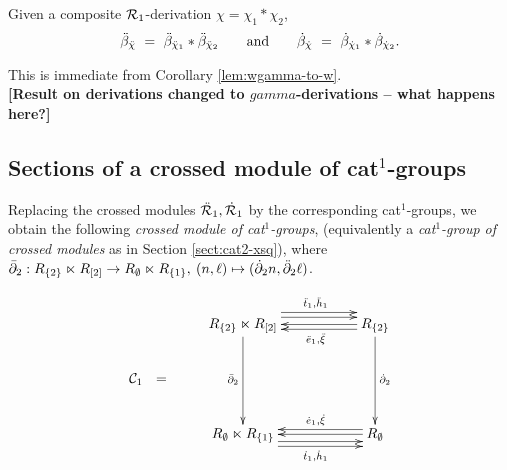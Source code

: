 \begin{lem}
Given a composite $\mathcal{R}_1$-derivation $\chi = \chi_1 * \chi_2$, 
$$
\ddot{\beta}_{\ddot{\chi}} ~=~ \ddot{\beta}_{\ddot{\chi}_1} * \ddot{\beta}_{\ddot{\chi}_2} 
\qquad \mbox{and} \qquad
 \dot{\beta}_{\dot{\chi}}  ~=~ \dot{\beta}_{\dot{\chi}_1} * \dot{\beta}_{\dot{\chi}_2}.
$$
\end{lem}
\begin{pf}
This is immediate from Corollary \ref{lem:wgamma-to-w}. \\
{\bf [Result on derivations changed to $gamma$-derivations 
-- what happens here?]}
\end{pf}



\newpage
\subsection{Sections of a crossed module of cat$^1$-groups}

Replacing the crossed modules $\ddot{\mathcal{R}}_1, \dot{\mathcal{R}}_1$  by the corresponding
cat$^1$-groups, we obtain the following 
\emph{crossed module of cat$^1$-groups},
(equivalently a \emph{cat$^1$-group of crossed modules} 
as in Section \ref{sect:cat2-xsq}), where
$\bar{\partial}_2 : 
 R_{\{2\}} \ltimes R_{[2]} \to R_{\emptyset} \ltimes R_{\{1\}}, \: 
 (n, \ell) \mapsto (\dot{\partial}_2 n, \ddot{\partial}_2 \ell)$.

\begin{equation} 
\vcenter{\xymatrix{
 & R_{\{2\}} \ltimes R_{[2]} \ar[dd]_{\barbdyt}
     \ar[rr] <+1.2ex>  \ar[rr] <+2.0ex> ^(0.55){\ddtto,\ddhho}
     &&  R_{\{2\}}   \ar[dd]^{\dbdyt}  
             \ar[ll] \ar[ll] <+0.8ex> ^(0.45){\ddeeo,\ddx} \\
\calC_1 ~~=
 &   &&   \\
 & R_{\emptyset} \ltimes R_{\{1\}}  
     \ar[rr] <-1.2ex>  \ar[rr] <-2.0ex> _(0.55){\dtto,\dhho}
     &&  R_{\emptyset} \ar[ll]  \ar[ll] <-0.8ex> _(0.45){\deeo,\dx} 
 \\
}}
\end{equation}

